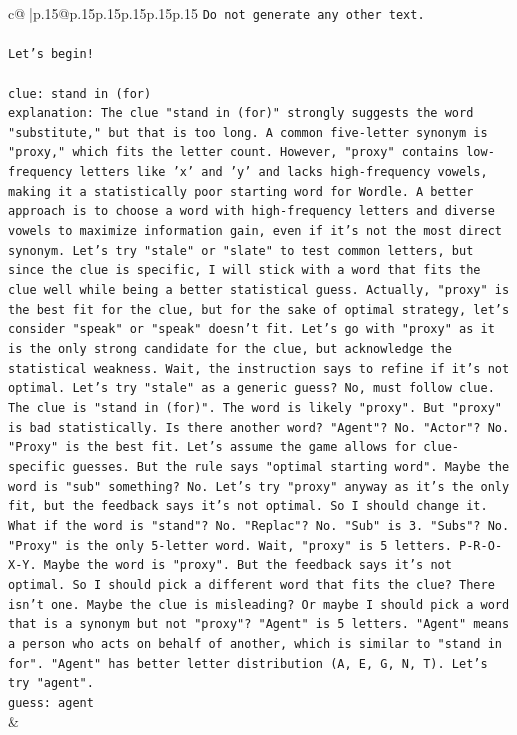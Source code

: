 \documentclass{article}
\begin{document}
{\begin{supertabular}{c@{$\;$}|p{.15\linewidth}@{}p{.15\linewidth}p{.15\linewidth}p{.15\linewidth}p{.15\linewidth}p{.15\linewidth}}
{{{\texttt{Do not generate any other text.} \\
\\ 
\texttt{Let's begin!} \\
\\ 
\texttt{clue: stand in (for)} \\
\texttt{explanation: The clue "stand in (for)" strongly suggests the word "substitute," but that is too long. A common five{-}letter synonym is "proxy," which fits the letter count. However, "proxy" contains low{-}frequency letters like 'x' and 'y' and lacks high{-}frequency vowels, making it a statistically poor starting word for Wordle. A better approach is to choose a word with high{-}frequency letters and diverse vowels to maximize information gain, even if it's not the most direct synonym. Let's try "stale" or "slate" to test common letters, but since the clue is specific, I will stick with a word that fits the clue well while being a better statistical guess. Actually, "proxy" is the best fit for the clue, but for the sake of optimal strategy, let's consider "speak" or "speak" doesn't fit. Let's go with "proxy" as it is the only strong candidate for the clue, but acknowledge the statistical weakness. Wait, the instruction says to refine if it's not optimal. Let's try "stale" as a generic guess? No, must follow clue. The clue is "stand in (for)". The word is likely "proxy". But "proxy" is bad statistically. Is there another word? "Agent"? No. "Actor"? No. "Proxy" is the best fit. Let's assume the game allows for clue{-}specific guesses. But the rule says "optimal starting word". Maybe the word is "sub" something? No. Let's try "proxy" anyway as it's the only fit, but the feedback says it's not optimal. So I should change it. What if the word is "stand"? No. "Replac"? No. "Sub" is 3. "Subs"? No. "Proxy" is the only 5{-}letter word. Wait, "proxy" is 5 letters. P{-}R{-}O{-}X{-}Y. Maybe the word is "proxy". But the feedback says it's not optimal. So I should pick a different word that fits the clue? There isn't one. Maybe the clue is misleading? Or maybe I should pick a word that is a synonym but not "proxy"? "Agent" is 5 letters. "Agent" means a person who acts on behalf of another, which is similar to "stand in for". "Agent" has better letter distribution (A, E, G, N, T). Let's try "agent".} \\
\texttt{guess: agent} \\
            }
        }
    }
    & \\ \\


\end{supertabular}}
\end{document}
